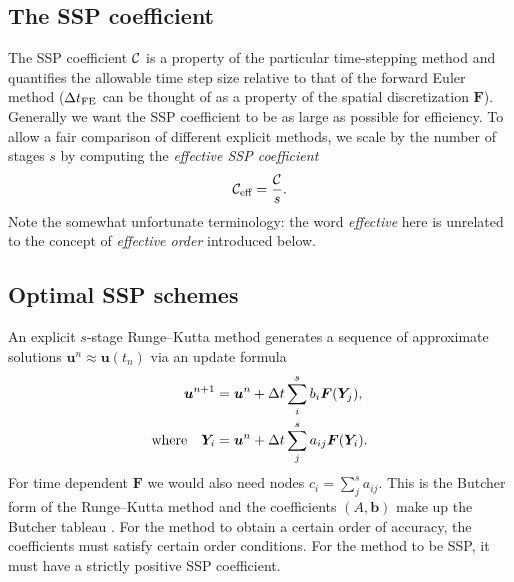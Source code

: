 \subsection{The SSP coefficient}

The SSP coefficient $\mathcal{C}$ is a property of the particular time-stepping method and quantifies the allowable time step size relative to that of the forward Euler method
($\Delta t_{\text{FE}}$ can be thought of as a property of the spatial discretization $\bm{F}$).
Generally we want the SSP coefficient to be as large as possible for efficiency.
To allow a fair comparison of different explicit methods, we scale by the number of stages $s$ by computing the \emph{effective SSP coefficient}
$$\mathcal{C}_{\text{eff}} = \frac{\mathcal{C}}{s}.$$
Note the somewhat unfortunate terminology: the word \emph{effective} here is unrelated to the concept of \emph{effective order} introduced below.


\subsection{Optimal SSP schemes}
\label{subsec:Optimal_SSPRK}


An explicit $s$-stage Runge--Kutta method generates a sequence of approximate solutions $\bm{u}^n \approx \bm{u}(t_n)$ via an update formula
\begin{align*}
\bm{u}^{n+1} &= \bm{u}^{n} + \Delta t \sum_i^s b_i \bm{F}(\bm{Y}_j), \\
\text{where} \quad \bm{Y}_{i} &= \bm{u}^{n} + \Delta t \sum_j^s a_{ij} \bm{F}(\bm{Y}_i).
\end{align*}
For time dependent $\bm{F}$ we would also need nodes $c_i =
\sum_j^sa_{ij}$.
This is the Butcher form of the Runge--Kutta method and the
coefficients $(A,\bm{b})$ make up the Butcher tableau
\cite{Butcher2008_book}.
For the method to obtain a certain order of accuracy, the coefficients must satisfy certain order conditions.
For the method to be SSP, it must have a strictly positive SSP
coefficient.


